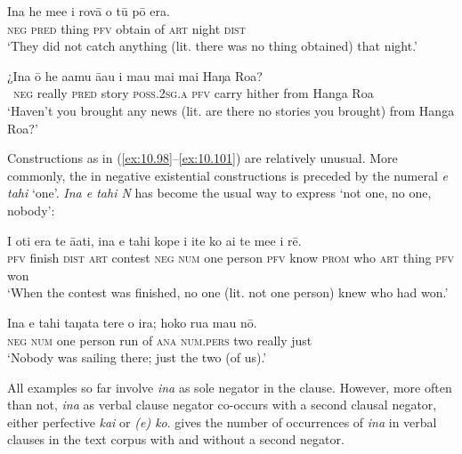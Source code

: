 \ea\label{ex:10.100}
\gll {\ꞌ}Ina he me{\ꞌ}e i rovā o tū pō era. \\
\textsc{neg} \textsc{pred} thing \textsc{pfv} obtain of \textsc{art} night \textsc{dist} \\

\glt 
‘They did not catch anything (lit. there was no thing obtained) that night.’ \textstyleExampleref{[R359.005]} 
\z

\ea\label{ex:10.101}
\gll ¿{\ꞌ}Ina {\ꞌ}ō he {\ꞌ}a{\ꞌ}amu {\ꞌ}ā{\ꞌ}au i ma{\ꞌ}u mai mai Haŋa Roa?\\
~\textsc{neg} really \textsc{pred} story \textsc{poss.2sg.a} \textsc{pfv} carry hither from Hanga Roa\\

\glt
‘Haven’t you brought any news (lit. are there no stories you brought) from Hanga Roa?’ \textstyleExampleref{[R380.039]} 
\z

Constructions as in (\ref{ex:10.98}–\ref{ex:10.101}) are relatively unusual. More commonly, the  in negative existential constructions is preceded by the numeral \textit{e tahi} ‘one’. \textit{{\ꞌ}Ina e tahi N} has become the usual way to express ‘not one, no one, nobody’:

\ea\label{ex:10.102}
\gll I oti era te {\ꞌ}ā{\ꞌ}ati, {\ꞌ}ina e tahi kope i {\ꞌ}ite  ko ai te me{\ꞌ}e i rē.\\
\textsc{pfv} finish \textsc{dist} \textsc{art} contest \textsc{neg} \textsc{num} one person \textsc{pfv} know  \textsc{prom} who \textsc{art} thing \textsc{pfv} won\\

\glt 
‘When the contest was finished, no one (lit. not one person) knew who had won.’ \textstyleExampleref{[R448.018]} 
\z

\ea\label{ex:10.103}
\gll {\ꞌ}Ina e tahi taŋata tere o ira; hoko rua mau nō. \\
\textsc{neg} \textsc{num} one person run of \textsc{ana} \textsc{num.pers} two really just \\

\glt 
‘Nobody was sailing there; just the two (of us).’ \textstyleExampleref{[R230.410]} 
\z

All examples so far involve \textit{{\ꞌ}ina} as sole negator in the clause. However, more often than not, \textit{{\ꞌ}ina} as verbal clause negator co-occurs with a second clausal negator, either perfective \textit{kai} or  \textit{(e) ko}.  gives the number of occurrences of \textit{{\ꞌ}ina} in verbal clauses in the text corpus with and without a second negator.

